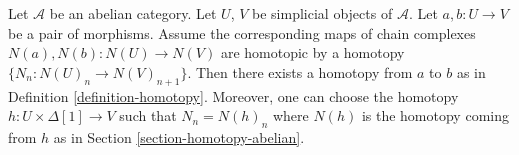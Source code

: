 %
\begin{lemma}
\label{lemma-backwards-homotopy}
Let $\mathcal{A}$ be an abelian category.
Let $U$, $V$ be simplicial objects of $\mathcal{A}$.
Let $a, b : U \to V$ be a pair of morphisms.
Assume the corresponding maps of chain complexes
$N(a), N(b) : N(U) \to N(V)$ are homotopic by
a homotopy $\{N_n : N(U)_n \to N(V)_{n + 1}\}$.
Then there exists a homotopy from $a$ to $b$ as in
Definition \ref{definition-homotopy}. Moreover, one can choose the
homotopy $h : U \times \Delta[1] \to V$ such that
$N_n = N(h)_n$ where $N(h)$ is the homotopy coming
from $h$ as in Section \ref{section-homotopy-abelian}.
\end{lemma}

